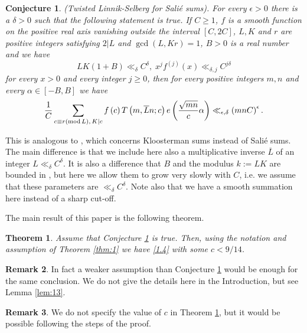 \documentclass[12pt]{amsart}
\newtheorem{theorem}{Theorem}[section]
\newtheorem{conjecture}{Conjecture}
\theoremstyle{definition}
\newtheorem{remark}[theorem]{Remark}
\numberwithin{equation}{section}
\begin{document}
\begin{conjecture}\label{conj:1} {\normalfont (Twisted Linnik-Selberg for
Salié sums).} For every $\epsilon >0$ there is a $\delta >0$ such
that the following statement is true. If $C\ge 1$, $f$ is a
smooth function on the positive real axis vanishing
outside the interval $\left[C,2C\right]$, $L,K$ and $r$ are positive integers
satisfying $2|L$ and $\gcd\left(L,Kr\right)=1$, $B>0$ is a real number and we have
\[LK\left(1+B\right)\ll_{\delta}C^{\delta},\;x^jf^{\left(j\right)}\left
(x\right)\ll_{\delta ,j}C^{j\delta}\]
for every $x>0$ and every integer $j\ge 0$, then for every positive integers $
m,n$ and
every $\alpha\in\left[-B,B\right]$ we have
\[\frac 1C\sum_{c\equiv r\left({\rm m}{\rm o}{\rm d}\,L\right),\,
K|c}f\left(c\right)T\left(m,\overline Ln;c\right)e\left(\frac {\sqrt {
mn}}c\alpha\right)\ll_{\epsilon ,\delta}\left(mnC\right)^{\epsilon}
.\]
\end{conjecture}

This is analogous to \cite[Conjecture 1.1]{Br}, which
concerns Kloosterman sums instead of Salié sums.
The main difference is that we include here also a
multiplicative inverse $\overline L$ of an integer $L\ll_{\delta}
C^{\delta}$. It is
also a difference that $B$ and the modulus $k:=LK$ are
bounded in \cite[Conjecture 1.1]{Br}, but here we allow
them to grow very slowly with $C$, i.e. we assume that
these parameters are $\ll_{\delta}C^{\delta}$. Note also that we have a
smooth summation here instead of a sharp cut-off.

The main result of this paper is the following theorem.

\begin{theorem}\label{thm:2}Assume that Conjecture
\ref{conj:1} is true. Then, using the notation and
assumption of Theorem \ref{thm:1} we have \eqref{1.4}
with some $c<9/14$.
\end{theorem}



\begin{remark}\label{rem:2}
In fact a weaker assumption than Conjecture
\ref{conj:1} would be enough for the same conclusion. We
do not give the details here in the Introduction, but see Lemma \ref{lem:13}.
\end{remark}



\begin{remark}
We do not specify the value of $c$ in Theorem \ref{thm:2}, but it would be possible following the steps of the
proof.
\end{remark}
\end{document}
